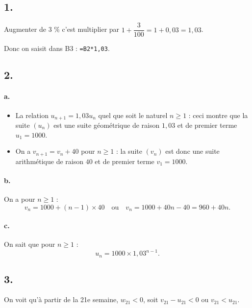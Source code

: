 \subsection*{1.}

Augmenter de 3 \% c'est multiplier par \(1 + \dfrac{3}{100} = 1 + 0{,}03 = 1{,}03\).

Donc on saisit dans B3 : \texttt{=B2*1,03}.

\subsection*{2.}

\paragraph{a.}
\begin{itemize}
    \item La relation \( u_{n+1} = 1{,}03 u_n \) quel que soit le naturel \(n \geqslant 1\) : ceci montre que la suite \((u_n)\) est une suite géométrique de raison \(1{,}03\) et de premier terme \(u_1 = 1000\).
    \item On a \( v_{n+1} = v_n + 40 \) pour \(n \geqslant 1\) : la suite \((v_n)\) est donc une suite arithmétique de raison \(40\) et de premier terme \(v_1 = 1000\).
\end{itemize}

\paragraph{b.} On a pour \(n \geqslant 1\) :
\[
v_n = 1000 + (n - 1) \times 40 \quad \text{ou} \quad v_n = 1000 + 40n - 40 = 960 + 40n.
\]

\paragraph{c.} On sait que pour \(n \geqslant 1\) :
\[
u_n = 1000 \times 1{,}03^{n-1}.
\]

\subsection*{3.}

On voit qu'à partir de la 21e semaine, \(w_{21} < 0\), soit \(v_{21} - u_{21} < 0\) ou \(v_{21} < u_{21}\).
